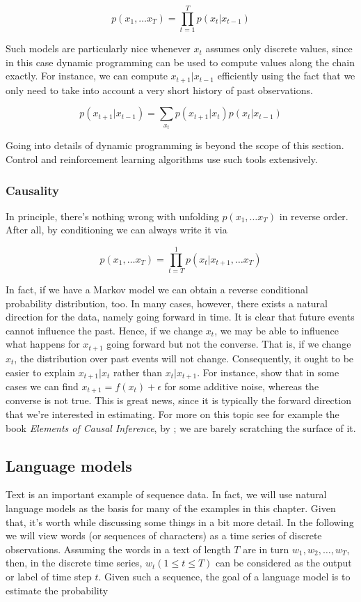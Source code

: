 $$p(x_1, \ldots x_T) = \prod_{t=1}^T p(x_t|x_{t-1})$$

Such models are particularly nice whenever $x_t$ assumes only discrete values, since in this case dynamic programming can be used to compute values along the chain exactly. For instance, we can compute $x_{t+1}|x_{t-1}$ efficiently using the fact that we only need to take into account a very short history of past observations.

$$p(x_{t+1}|x_{t-1}) = \sum_{x_t} p(x_{t+1}|x_t) p(x_t|x_{t-1})$$

Going into details of dynamic programming is beyond the scope of this section. Control and reinforcement learning algorithms use such tools extensively.

\subsubsection{Causality}

In principle, there’s nothing wrong with unfolding $p(x_1, \ldots x_T)$ in reverse order. After all, by conditioning we can always write it via

$$p(x_1, \ldots x_T) = \prod_{t=T}^1 p(x_t|x_{t+1}, \ldots x_T)$$

In fact, if we have a Markov model we can obtain a reverse conditional probability distribution, too. In many cases, however, there exists a natural direction for the data, namely going forward in time. It is clear that future events cannot influence the past. Hence, if we change $x_t$, we may be able to influence what happens for $x_{t+1}$ going forward but not the converse. That is, if we change $x_t$, the distribution over past events will not change. Consequently, it ought to be easier to explain $x_{t+1}|x_t$ rather than $x_t|x_{t+1}$. For instance, \citet{Hoyer2008} show that in some cases we can find $x_{t+1} = f(x_t) + \epsilon$ for some additive noise, whereas the converse is not true. This is great news, since it is typically the forward direction that we’re interested in estimating. For more on this topic see for example the book \textit{Elements of Causal Inference}, by \citet{Peters2015}; we are barely scratching the surface of it.

\subsection{Language models}\label{subsec:lang_models}

Text is an important example of sequence data. In fact, we will use natural language models as the basis for many of the examples in this chapter. Given that, it’s worth while discussing some things in a bit more detail. In the following we will view words (or sequences of characters) as a time series of discrete observations. Assuming the words in a text of length $T$ are in turn $w_1, w_2, \ldots, w_T$, then, in the discrete time series, $w_t(1 \leq t \leq T)$ can be considered as the output or label of time step $t$. Given such a sequence, the goal of a language model is to estimate the probability

